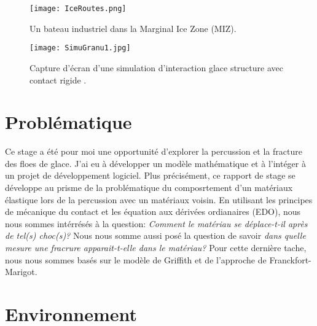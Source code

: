 \begin{figure}[!h]
    \centering
    \texttt{[image: IceRoutes.png]}
    \caption{Un bateau industriel dans la Marginal Ice Zone (MIZ).}
    \label{fig:miz}
\end{figure}

\begin{figure}[!h]
    \centering
    \texttt{[image: SimuGranu1.jpg]}
    \caption{Capture d’écran d’une simulation d’interaction glace structure avec contact rigide \parencite[p.23]{balasoiu2020halthesis}.}
    \label{fig:simugranu1}
\end{figure}







\section{Problématique}


Ce stage a été pour moi une opportunité d'explorer la percussion et la fracture des floes de glace. J'ai eu à développer un modèle mathématique et à l'intéger à un projet de développement logiciel. Plus précisément, ce rapport de stage se développe au prisme de la problématique du composrtement d'un matériaux élastique lors de la percussion avec un matériaux voisin. En utilisant les principes de mécanique du contact et les équation aux dérivées ordianaires (EDO), nous nous sommes intérrésés à la question: \emph{Comment le matériau se déplace-t-il après de tel(s) choc(s)?} Nous nous somme aussi posé la question de savoir \emph{dans quelle mesure une fracrure apparait-t-elle dans le matériau?} Pour cette dernière tache, nous nous sommes basés sur le modèle de Griffith et de l'approche de Franckfort-Marigot.











\section{Environnement}


